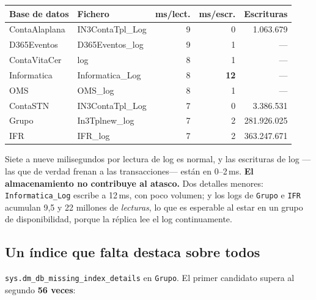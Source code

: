 \documentclass[11pt,a4paper]{article}
\newcommand{\cod}[1]{\texttt{\small #1}}
\newcommand{\aviso}[1]{\textcolor{ambar}{\textbf{#1}}}
\begin{document}
\begin{table}[h]
\centering
\small
\begin{tabular}{llrrr}
\toprule
\textbf{Base de datos} & \textbf{Fichero} & \textbf{ms/lect.} &
\textbf{ms/escr.} & \textbf{Escrituras} \\
\midrule
ContaAlaplana & IN3ContaTpl\_Log & 9 & 0 & 1.063.679 \\
D365Eventos   & D365Eventos\_log & 9 & 1 & --- \\
ContaVitaCer  & log              & 8 & 1 & --- \\
Informatica   & Informatica\_Log & 8 & \aviso{12} & --- \\
OMS           & OMS\_log         & 8 & 1 & --- \\
ContaSTN      & IN3ContaTpl\_Log & 7 & 0 & 3.386.531 \\
Grupo         & In3Tplnew\_log   & 7 & 2 & 281.926.025 \\
IFR           & IFR\_log         & 7 & 2 & 363.247.671 \\
\bottomrule
\end{tabular}
\end{table}

Siete a nueve milisegundos por lectura de log es normal, y las escrituras de
log —las que de verdad frenan a las transacciones— están en 0--2\,ms.
\textbf{El almacenamiento no contribuye al atasco.} Dos detalles menores:
\cod{Informatica\_Log} escribe a 12\,ms, con poco volumen; y los logs de
\cod{Grupo} e \cod{IFR} acumulan 9,5 y 22 millones de \emph{lecturas}, lo que
es esperable al estar en un grupo de disponibilidad, porque la réplica lee el
log continuamente.

\subsection{Un índice que falta destaca sobre todos}

\cod{sys.dm\_db\_missing\_index\_details} en \cod{Grupo}. El primer candidato
supera al segundo \textbf{56 veces}:
\end{document}
